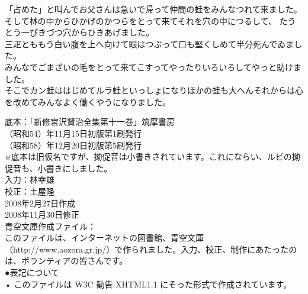 \documentclass[
a4paper,
10pt,
book]
{tarticle}
\begin{document}
\newpage
\setcounter{page}{30}
\thispagestyle{fancy}
\begin{linenumbers}
    \noindent「占めた」と叫んでお父さんは急いで帰って仲間の蛙をみんなつれて来ました。そして林の中からひかげのかつらをとって来てそれを穴の中につるして、
    たうとう一ぴきづつ穴からひきあげました。\\
    \indent 三疋とももう白い腹を上へ向けて眼はつぶって口も堅くしめて半分死んでゐました。\\
    \indent みんなでごまざいの毛をとって来てこすってやったりいろいろしてやっと助けました。\\
    \indent そこでカン蛙ははじめてルラ蛙といっしょになりほかの蛙も大へんそれからは心を改めてみんなよく働くやうになりました。
\end{linenumbers}
    \newpage
底本：「新修宮沢賢治全集\indent 第十一巻」筑摩書房\\
\indent \indent {}（昭和54）年11月15日初版第1刷発行\\
\indent \indent {}（昭和58）年12月20日初版第5刷発行\\
※底本は旧仮名ですが、拗促音は小書きされています。これにならい、ルビの拗促音も、小書きにしました。\\
入力：林\indent 幸雄\\
校正：土屋隆\\
2008年2月27日作成\\
2008年11月30日修正\\
青空文庫作成ファイル：\\
このファイルは、インターネットの図書館、青空文庫（http://www.aozora.gr.jp/）で作られました。入力、校正、制作にあたったのは、ボランティアの皆さんです。\\
●表記について\\
•	このファイルは W3C 勧告 XHTML1.1 にそった形式で作成されています。\\
\begin{comment}
a
\end{comment}
\end{document}

